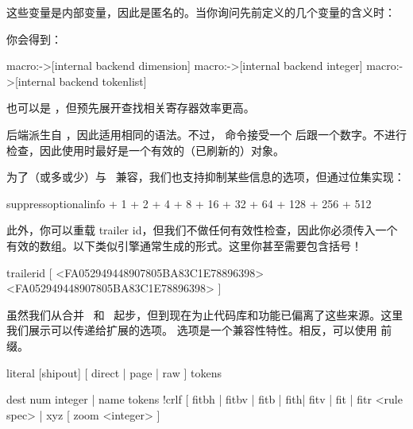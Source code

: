 这些变量是内部变量，因此是匿名的。当你询问先前定义的几个变量的含义时：

\begin{typing}
\meaning\pdfhorigin
\meaning\pdfcompresslevel
\meaning\pdfpageattr
\end{typing}

你会得到：

\begin{typing}
macro:->[internal backend dimension]
macro:->[internal backend integer]
macro:->[internal backend tokenlist]
\end{typing}

 也可以是 ，但预先展开查找相关寄存器效率更高。

后端派生自 \PDFTEX，因此适用相同的语法。不过， 命令接受一个  后跟一个数字。不进行检查，因此使用时最好是一个有效的（已刷新的）对象。

为了（或多或少）与 \PDFTEX\ 兼容，我们也支持抑制某些信息的选项，但通过位集实现：

\begin{typing}
\pdfvariable suppressoptionalinfo 
    +   1   %
    +   2   %
    +   4   %
    +   8   %
    +  16   %
    +  32   %
    +  64   %
    + 128   %
    + 256   %
    + 512   %
\relax
\end{typing}

此外，你可以重载 trailer id，但我们不做任何有效性检查，因此你必须传入一个有效的数组。以下类似引擎通常生成的形式。这里你甚至需要包含括号！

\begin{typing}
\pdfvariable trailerid {[
    <FA052949448907805BA83C1E78896398>
    <FA052949448907805BA83C1E78896398>
]}
\end{typing}

虽然我们从合并 \PDFTEX\ 和 \ALEPH\ 起步，但到现在为止代码库和功能已偏离了这些来源。这里我们展示可以传递给扩展的选项。 选项是一个兼容性特性。相反，可以使用  前缀。

\begin{typing}
\pdfextension literal
    [shipout] [ direct | page | raw ] { tokens }
\end{typing}

\begin{typing}
\pdfextension dest
    num integer | name { tokens }!crlf
    [ fitbh | fitbv | fitb | fith| fitv | fit |
      fitr <rule spec> | xyz [ zoom <integer> ]
\end{typing}

